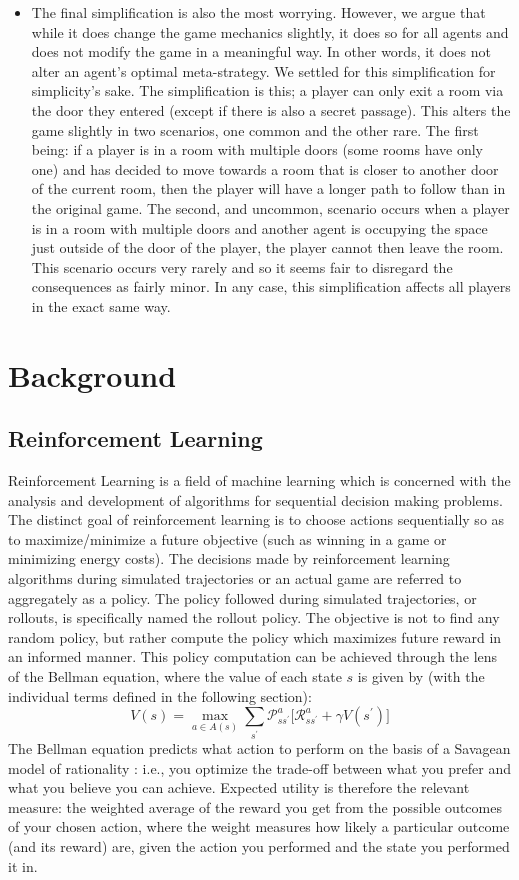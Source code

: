 \documentclass[msc, deptreport, ai, romanprepages]{infthesis}
\begin{document}
\begin{itemize}
\item The final simplification is also the most worrying. However, we argue that while it does change the game mechanics slightly, it does so for all agents and does not modify the game in a meaningful way. In other words, it does not alter an agent’s optimal meta-strategy. We settled for this simplification for simplicity’s sake. The simplification is this; a player can only exit a room via the door they entered (except if there is also a secret passage). This alters the game slightly in two scenarios, one common and the other rare. The first being: if a player is in a room with multiple doors (some rooms have only one) and has decided to move towards a room that is closer to another door of the current room, then the player will have a longer path to follow than in the original game. The second, and uncommon, scenario occurs when a player is in a room with multiple doors and another agent is occupying the space just outside of the door of the player, the player cannot then leave the room. This scenario occurs very rarely and so it seems fair to disregard the consequences as fairly minor. In any case, this simplification affects all players in the exact same way.
\end{itemize}
\chapter{Background}
\section{Reinforcement Learning}
Reinforcement Learning is a field of machine learning which is concerned with the analysis and development of algorithms for sequential decision making problems. The distinct goal of reinforcement learning is to choose actions sequentially so as to maximize/minimize a future objective (such as winning in a game or minimizing energy costs). The decisions made by reinforcement learning algorithms during simulated trajectories or an actual game are referred to aggregately as a policy. The policy followed during simulated trajectories, or rollouts, is specifically named the rollout policy. The objective is not to find any random policy, but rather compute the policy which maximizes future reward in an informed manner. This policy computation can be achieved through the lens of the Bellman equation, where the value of each state \(s\) is given by (with the individual terms defined in the following section):
\begin{equation}
V(s) = \max_{a \in A(s)} \sum_{s^\prime} \mathcal{P}_{s{s^\prime}}^a \Big[\mathcal{R}_{s{s^\prime}}^a + \gamma V({s^\prime}) \Big]
\end{equation}
The Bellman equation predicts what action to perform on the basis of a Savagean model of rationality \cite{Savage}: i.e., you optimize the trade-off between what you prefer and what you believe you can achieve. Expected utility is therefore the relevant measure: the weighted average of the reward you get from the possible outcomes of your chosen action, where the weight measures how likely a particular outcome (and its reward) are, given the action you performed and the state you performed it in.
\end{document}
